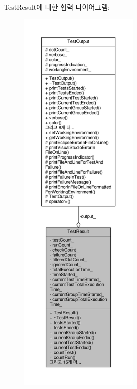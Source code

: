 Test\+Result에 대한 협력 다이어그램\+:
\nopagebreak
\begin{figure}[H]
\begin{center}
\leavevmode
\includegraphics[height=550pt]{class_test_result__coll__graph}
\end{center}
\end{figure}
